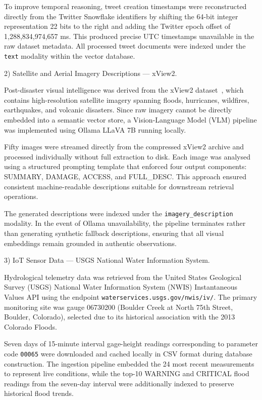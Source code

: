 \documentclass[conference]{IEEEtran}
\begin{document}
To improve temporal reasoning, tweet creation timestamps were reconstructed directly
from the Twitter Snowflake identifiers by shifting the 64-bit integer representation
22 bits to the right and adding the Twitter epoch offset of 1,288,834,974,657 ms.
This produced precise UTC timestamps unavailable in the raw dataset metadata. All
processed tweet documents were indexed under the \texttt{text} modality within the
vector database.

2) Satellite and Aerial Imagery Descriptions --- xView2.

Post-disaster visual intelligence was derived from the xView2 dataset~\cite{b22},
which contains high-resolution satellite imagery spanning floods, hurricanes,
wildfires, earthquakes, and volcanic disasters. Since raw imagery cannot be directly
embedded into a semantic vector store, a Vision-Language Model (VLM) pipeline was
implemented using Ollama LLaVA 7B running locally.

Fifty images were streamed directly from the compressed xView2 archive and processed
individually without full extraction to disk. Each image was analysed using a
structured prompting template that enforced four output components: SUMMARY,
DAMAGE, ACCESS, and FULL\_DESC. This approach ensured consistent machine-readable
descriptions suitable for downstream retrieval operations.

The generated descriptions were indexed under the
\texttt{imagery\_description} modality. In the event of Ollama unavailability, the
pipeline terminates rather than generating synthetic fallback descriptions, ensuring
that all visual embeddings remain grounded in authentic observations.

3) IoT Sensor Data --- USGS National Water Information System.

Hydrological telemetry data was retrieved from the United States Geological Survey
(USGS) National Water Information System (NWIS) Instantaneous Values API using the
endpoint \texttt{waterservices.usgs.gov/nwis/iv/}. The primary monitoring site was
gauge 06730200 (Boulder Creek at North 75th Street, Boulder, Colorado), selected due
to its historical association with the 2013 Colorado Floods.

Seven days of 15-minute interval gage-height readings corresponding to parameter code
\texttt{00065} were downloaded and cached locally in CSV format during database
construction. The ingestion pipeline embedded the 24 most recent measurements to
represent live conditions, while the top-10 WARNING and CRITICAL flood readings from
the seven-day interval were additionally indexed to preserve historical flood trends.
\end{document}
